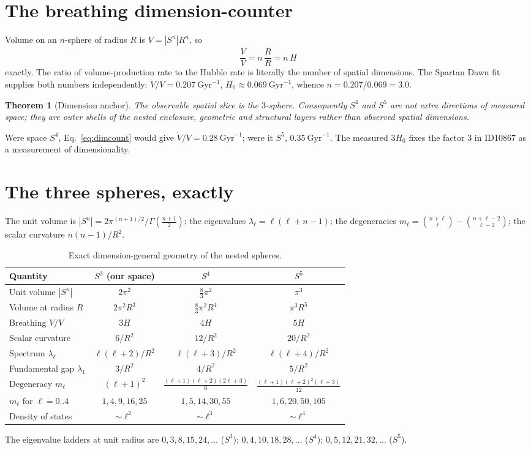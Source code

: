 \documentclass[11pt]{article}
\newtheorem{theorem}{Theorem}[section]
\theoremstyle{remark}
\begin{document}
\section{The breathing dimension-counter}
Volume on an $n$-sphere of radius $R$ is $V = |S^n| R^n$, so
\begin{equation}
\boxed{\ \frac{\dot V}{V} = n\,\frac{\dot R}{R} = n\,H\ }
\label{eq:dimcount}
\end{equation}
exactly. The ratio of volume-production rate to the Hubble rate is literally the number of spatial dimensions. The Spartan Dawn fit supplies both numbers independently: $\dot V/V = 0.207\ \mathrm{Gyr}^{-1}$, $H_0 \approx 0.069\ \mathrm{Gyr}^{-1}$, whence $n = 0.207/0.069 = 3.0$.
\begin{theorem}[Dimension anchor]
The observable spatial slice is the $3$-sphere. Consequently $S^4$ and $S^5$ are not extra directions of measured space; they are outer shells of the nested enclosure, geometric and structural layers rather than observed spatial dimensions.
\end{theorem}
Were space $S^4$, Eq.~\eqref{eq:dimcount} would give $\dot V/V = 0.28\ \mathrm{Gyr}^{-1}$; were it $S^5$, $0.35\ \mathrm{Gyr}^{-1}$. The measured $3H_0$ fixes the factor $3$ in ID10867 as a measurement of dimensionality.
\section{The three spheres, exactly}
The unit volume is $|S^n| = 2\pi^{(n+1)/2}/\Gamma(\tfrac{n+1}{2})$; the eigenvalues $\lambda_\ell = \ell(\ell+n-1)$; the degeneracies $m_\ell = \binom{n+\ell}{\ell} - \binom{n+\ell-2}{\ell-2}$; the scalar curvature $n(n-1)/R^2$.
\begin{table}[ht]\centering
\caption{Exact dimension-general geometry of the nested spheres.}
\label{tab:geom}
\begin{tabular}{lccc}
\toprule
Quantity & $S^3$ (our space) & $S^4$ & $S^5$ \\
\midrule
Unit volume $|S^n|$ & $2\pi^2$ & $\tfrac{8}{3}\pi^2$ & $\pi^3$ \\
Volume at radius $R$ & $2\pi^2 R^3$ & $\tfrac{8}{3}\pi^2 R^4$ & $\pi^3 R^5$ \\
Breathing $\dot V/V$ & $3H$ & $4H$ & $5H$ \\
Scalar curvature & $6/R^2$ & $12/R^2$ & $20/R^2$ \\
Spectrum $\lambda_\ell$ & $\ell(\ell+2)/R^2$ & $\ell(\ell+3)/R^2$ & $\ell(\ell+4)/R^2$ \\
Fundamental gap $\lambda_1$ & $3/R^2$ & $4/R^2$ & $5/R^2$ \\
Degeneracy $m_\ell$ & $(\ell+1)^2$ & $\tfrac{(\ell+1)(\ell+2)(2\ell+3)}{6}$ & $\tfrac{(\ell+1)(\ell+2)^2(\ell+3)}{12}$ \\
$m_\ell$ for $\ell = 0..4$ & $1,4,9,16,25$ & $1,5,14,30,55$ & $1,6,20,50,105$ \\
Density of states & $\sim \ell^2$ & $\sim \ell^3$ & $\sim \ell^4$ \\
\bottomrule
\end{tabular}
\end{table}
The eigenvalue ladders at unit radius are $0,3,8,15,24,\dots$ ($S^3$); $0,4,10,18,28,\dots$ ($S^4$); $0,5,12,21,32,\dots$ ($S^5$).
\end{document}
